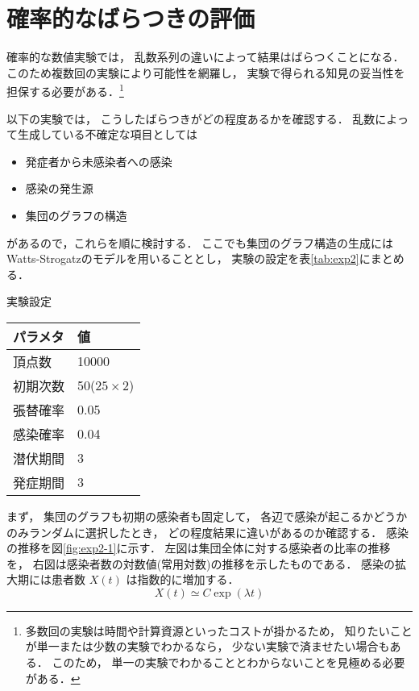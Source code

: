 \documentclass[10pt,oneside]{scrartcl}
\begin{document}
\section{確率的なばらつきの評価}
\label{sec:org19cb8f4}

確率的な数値実験では，
乱数系列の違いによって結果はばらつくことになる．
このため複数回の実験により可能性を網羅し，
実験で得られる知見の妥当性を担保する必要がある．\footnote{多数回の実験は時間や計算資源といったコストが掛かるため，
知りたいことが単一または少数の実験でわかるなら，
少ない実験で済ませたい場合もある．
このため，
単一の実験でわかることとわからないことを見極める必要がある．}

以下の実験では，
こうしたばらつきがどの程度あるかを確認する．
乱数によって生成している不確定な項目としては
\begin{itemize}
\item 発症者から未感染者への感染
\item 感染の発生源
\item 集団のグラフの構造
\end{itemize}
があるので，これらを順に検討する．
ここでも集団のグラフ構造の生成には
Watts-Strogatzのモデルを用いることとし，
実験の設定を表\ref{tab:exp2}にまとめる．

\begin{margintable}
  \caption{実験設定}
  \label{tab:exp2}
  \small
  \begin{tabular}{ll}
    \toprule
    パラメタ&値 \\
    \midrule
    頂点数&10000 \\
    初期次数&50\;($25\times2$) \\
    張替確率&0.05 \\
    感染確率&0.04 \\
    潜伏期間&3 \\
    発症期間&3 \\
    \bottomrule
  \end{tabular}
\end{margintable}

\begin{figure*}%
  \centering
\end{figure*}

まず，
集団のグラフも初期の感染者も固定して，
各辺で感染が起こるかどうかのみランダムに選択したとき，
どの程度結果に違いがあるのか確認する．
感染の推移を図\ref{fig:exp2-1}に示す．
左図は集団全体に対する感染者の比率の推移を，
右図は感染者数の対数値(常用対数)の推移を示したものである．
感染の拡大期には患者数 \(X(t)\) は指数的に増加する．
\begin{equation}
  X(t)\simeq C\exp(\lambda t)
\end{equation}
\end{document}
